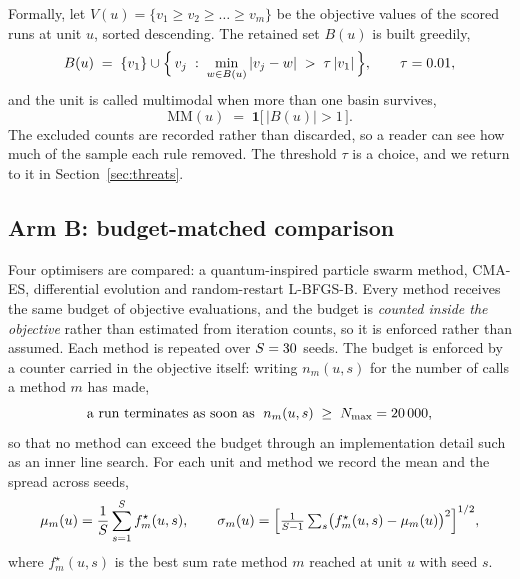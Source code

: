 \documentclass[runningheads]{llncs}
\begin{document}
Formally, let $V(u)=\{v_1\ge v_2\ge\dots\ge v_m\}$ be the objective values of the scored runs
at unit $u$, sorted descending. The retained set $B(u)$ is built greedily,
\begin{equation}
  B(u) \;=\; \{v_1\} \cup
  \Bigl\{\, v_j \;:\; \min_{w \in B(u)} |v_j - w| \;>\; \tau\,|v_1| \,\Bigr\},
  \qquad \tau = 0.01,
  \label{eq:basins}
\end{equation}
and the unit is called multimodal when more than one basin survives,
\begin{equation}
  \mathrm{MM}(u) \;=\; \mathbf{1}\bigl[\,|B(u)| > 1\,\bigr].
  \label{eq:mm}
\end{equation}
The excluded counts are recorded rather than discarded, so a reader can see how much of the
sample each rule removed. The threshold $\tau$ is a choice, and we return to it in
Section~\ref{sec:threats}.

\subsection{Arm B: budget-matched comparison}

\begin{sloppypar}
Four optimisers are compared: a quantum-inspired particle swarm method, CMA-ES, differential
evolution and random-restart L-BFGS-B. Every method receives the same budget of \numBudget{}
objective evaluations, and the budget is \emph{counted inside the objective} rather than
estimated from iteration counts, so it is enforced rather than assumed. Each method is repeated
over $S=30$ seeds. The budget is enforced by a counter carried in the objective itself:
writing $n_m(u,s)$ for the number of calls a method $m$ has made,
\begin{equation}
  \text{a run terminates as soon as } \; n_m(u,s) \;\ge\; N_{\max} = 20\,000 ,
  \label{eq:budget}
\end{equation}
so that no method can exceed the budget through an implementation detail such as an inner line
search. For each unit and method we record the mean and the spread across seeds,
\begin{equation}
  \mu_m(u) = \frac{1}{S}\sum_{s=1}^{S} f^{\star}_m(u,s),
  \qquad
  \sigma_m(u) = \Bigl[\tfrac{1}{S-1}\textstyle\sum_{s}\bigl(f^{\star}_m(u,s)-\mu_m(u)\bigr)^2\Bigr]^{1/2},
  \label{eq:agg}
\end{equation}
where $f^{\star}_m(u,s)$ is the best sum rate method $m$ reached at unit $u$ with seed $s$.
\end{sloppypar}
\end{document}
